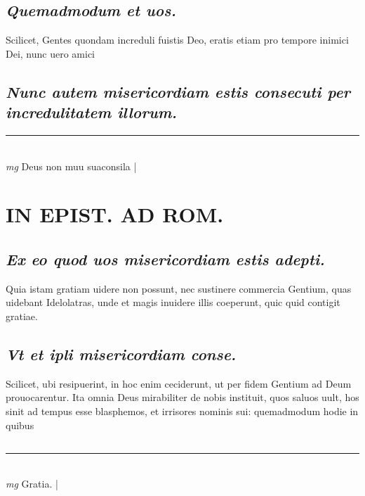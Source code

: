 \documentclass{article}
\begin{document}
\begin{pages}
\subsection*{\textit{Quemadmodum et uos. }}\pstart Scilicet, Gentes quondam increduli fuistis Deo, eratis etiam pro tempore inimici Dei, nunc uero amici  \pend
{}
{}
\subsection*{\textit{Nunc autem misericordiam estis consecuti per incredulitatem illorum. }}\pstart  \pend
\vspace{0.5cm}\noindent
\vspace{0.2cm}\rule{1cm}{0.2pt}\\ 
\hspace{0.2cm}\textit{mg}
\footnotesize Deus non muu suaconsila 
\normalsize| 
\section*{IN EPIST. AD ROM.  }
\marginpar{[ p.139 ]}
{}
\subsection*{\textit{Ex eo quod uos misericordiam estis adepti. }}\pstart Quia istam gratiam uidere non possunt, nec sustinere commercia Gentium, quas uidebant Idelolatras, unde et magis inuidere illis coeperunt, quic quid contigit gratiae.   \pend
{}
{}
\subsection*{\textit{Vt et ipli misericordiam conse. }}\pstart Scilicet, ubi resipuerint, in hoc enim ceciderunt, ut per fidem Gentium ad Deum prouocarentur. Ita omnia Deus mirabiliter de nobis instituit, quos saluos uult, hos sinit ad tempus esse blasphemos, et irrisores nominis sui: quemadmodum hodie in quibus\pend
{}
{}
\subsection*{\textit{}}\pstart  \pend
\vspace{0.5cm}\noindent
\vspace{0.2cm}\rule{1cm}{0.2pt}\\ 
\hspace{0.2cm}\textit{mg}
\footnotesize Gratia.  
\normalsize| 

\end{pages}
\end{document}
